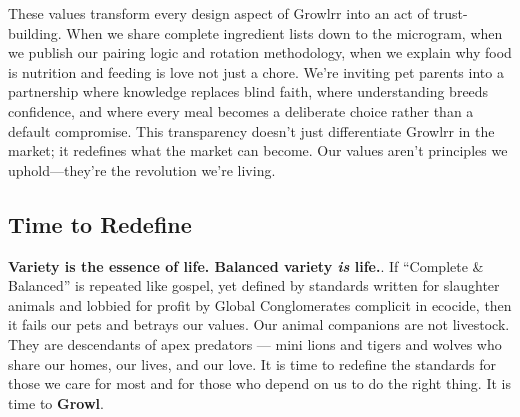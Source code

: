 These values transform every design aspect of Growlrr into an act of trust-building. When we share complete ingredient lists down to the microgram, when we publish our pairing logic and rotation methodology, when we explain why food is nutrition  and feeding is love not just a chore. We're inviting pet parents into a partnership where knowledge replaces blind faith, where understanding breeds confidence, and where every meal becomes a deliberate choice rather than a default compromise. This transparency doesn't just differentiate Growlrr in the market; it redefines what the market can become. Our values aren't principles we uphold—they're the revolution we're living.

\subsection*{Time to Redefine}




\textbf{Variety is the essence of life. Balanced variety \textit{is} life.}. If ``Complete \& Balanced'' is repeated like gospel, yet defined by standards written for slaughter animals and lobbied for profit by Global Conglomerates complicit in ecocide, then it fails our pets and betrays our values.
Our animal companions are not livestock. They are descendants of apex predators --- mini lions and tigers  and wolves who share our homes, our lives, and our love\cite{ref1}.
It is time to redefine the standards for those we care for most and for those who depend on us to do the right thing. 
It is time to \textbf{Growl}.